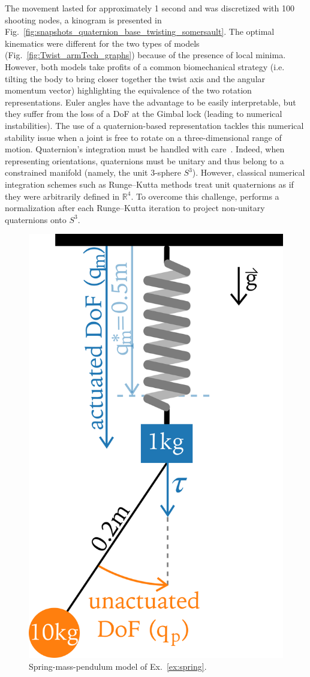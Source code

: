 The movement lasted for approximately 1 second and was discretized with 100 shooting nodes, a kinogram is presented in Fig.~\ref{fig:snapshots_quaternion_base_twisting_somersault}.
The optimal kinematics were different for the two types of models (Fig.~\ref{fig:Twist_armTech_graphs}) because of the presence of local minima.
However, both models take profits of a common biomechanical strategy (i.e. tilting the body to bring closer together the twist axis and the angular momentum vector) highlighting the equivalence of the two rotation representations.
Euler angles have the advantage to be easily interpretable, but they suffer from the loss of a DoF at the Gimbal lock (leading to numerical instabilities).
The use of a quaternion-based representation tackles this numerical stability issue when a joint is free to rotate on a three-dimensional range of motion.
Quaternion's integration must be handled with care~\cite{bailly2020optimal}.
Indeed, when representing orientations, quaternions must be unitary and thus belong to a constrained manifold (namely, the unit 3-sphere $S^3$). 
However, classical numerical integration schemes such as Runge–Kutta methods treat unit quaternions as if they were arbitrarily defined in $\mathbb{R}^4$.
To overcome this challenge, \bioptim performs a normalization after each Runge–Kutta iteration to project non-unitary quaternions onto $S^3$.

\begin{figure}[t!]
\centering
\includegraphics[width=0.35\columnwidth]{figures/Mass_Pendulum_Model_2.png}
\caption{Spring-mass-pendulum model of Ex.~\ref{ex:spring}.}
\label{fig:Mass_Pendulum_Model}
\vspace*{-0.5cm}
\end{figure}

